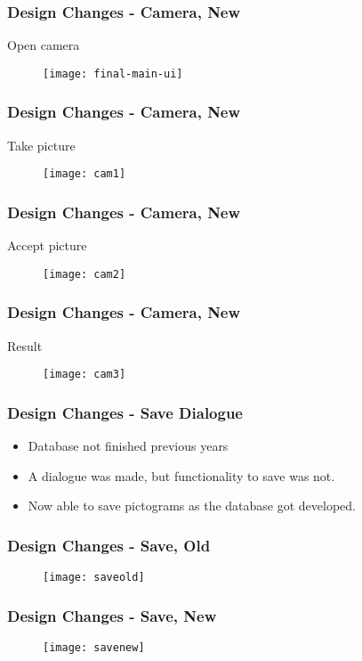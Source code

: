 \begin{frame}
	\frametitle{Design Changes - Camera, New}
	Open camera
		\begin{figure}
		\centering
			\texttt{[image: final-main-ui]}
		\end{figure}
\end{frame}

\begin{frame}
	\frametitle{Design Changes - Camera, New}
	Take picture
		\begin{figure}
		\centering
			\texttt{[image: cam1]}
		\end{figure}
\end{frame}

\begin{frame}
	\frametitle{Design Changes - Camera, New}
	Accept picture
		\begin{figure}
		\centering
			\texttt{[image: cam2]}
		\end{figure}
\end{frame}

\begin{frame}
	\frametitle{Design Changes - Camera, New}
	Result
		\begin{figure}
		\centering
			\texttt{[image: cam3]}
		\end{figure}
\end{frame}
\begin{frame}
	\frametitle{Design Changes - Save Dialogue}
	\begin{itemize}
	\item Database not finished previous years
	\item A dialogue was made, but functionality to save was not.
	\item Now able to save pictograms as the database got developed.
	\end{itemize}
\end{frame}

\begin{frame}
	\frametitle{Design Changes - Save, Old}
		\begin{figure}
		\centering
			\texttt{[image: saveold]}
		\end{figure}
\end{frame}

\begin{frame}
	\frametitle{Design Changes - Save, New}
		\begin{figure}
		\centering
			\texttt{[image: savenew]}
		\end{figure}
\end{frame}